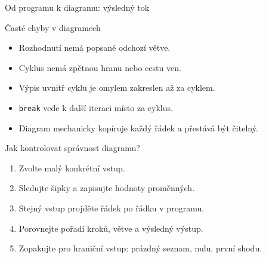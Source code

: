 \documentclass[aspectratio=169]{beamer}
\begin{document}
\begin{frame}{Od programu k diagramu: výsledný tok}
  \centering
  \vspace{4mm}
\end{frame}

\begin{frame}{Časté chyby v diagramech}
  \begin{itemize}
    \item Rozhodnutí nemá popsané odchozí větve.
    \item Cyklus nemá zpětnou hranu nebo cestu ven.
    \item Výpis uvnitř cyklu je omylem zakreslen až za cyklem.
    \item \texttt{break} vede k další iteraci místo za cyklus.
    \item Diagram mechanicky kopíruje každý řádek a přestává být čitelný.
  \end{itemize}
\end{frame}

\begin{frame}{Jak kontrolovat správnost diagramu?}
  \begin{enumerate}
    \item Zvolte malý konkrétní vstup.
    \item Sledujte šipky a zapisujte hodnoty proměnných.
    \item Stejný vstup projděte řádek po řádku v programu.
    \item Porovnejte pořadí kroků, větve a výsledný výstup.
    \item Zopakujte pro hraniční vstup: prázdný seznam, nulu, první shodu.
  \end{enumerate}
\end{frame}
\end{document}
